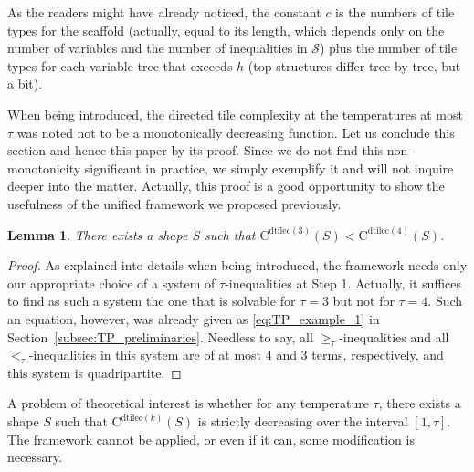 \documentclass{article}
\newtheorem{lemma}[theorem]{Lemma}
\theoremstyle{remark}
\theoremstyle{definition}
\newcommand{\dtilec}[1]{\ensuremath{\mathrm{C}^{\mathrm{dtilec}(#1)}}}
\begin{document}
As the readers might have already noticed, the constant $c$ is the numbers of tile types for the scaffold (actually, equal to its length, which depends only on the number of variables and the number of inequalities in $\mathcal{S}$) plus the number of tile types for each variable tree that exceeds $h$ (top structures differ tree by tree, but a bit). 

When being introduced, the directed tile complexity at the temperatures at most $\tau$ was noted not to be a monotonically decreasing function. 
Let us conclude this section and hence this paper by its proof. 
Since we do not find this non-monotonicity significant in practice, we simply exemplify it and will not inquire deeper into the matter. 
Actually, this proof is a good opportunity to show the usefulness of the unified framework we proposed previously. 

\begin{lemma}
	There exists a shape $S$ such that $\dtilec{3}(S) < \dtilec{4}(S)$. 
\end{lemma}
\begin{proof}
	As explained into details when being introduced, the framework needs only our appropriate choice of a system of $\tau$-inequalities at Step 1. 
	Actually, it suffices to find as such a system the one that is solvable for $\tau = 3$ but not for $\tau = 4$. 
	Such an equation, however, was already given as \eqref{eq:TP_example_1} in Section~\ref{subsec:TP_preliminaries}. 
	Needless to say, all $\ge_\tau$-inequalities and all $<_\tau$-inequalities in this system are of at most 4 and 3 terms, respectively, and this system is quadripartite. 
\end{proof}

A problem of theoretical interest is whether for any temperature $\tau$, there exists a shape $S$ such that $\dtilec{k}(S)$ is strictly decreasing over the interval $[1, \tau]$. 
The framework cannot be applied, or even if it can, some modification is necessary.  

\end{document}
